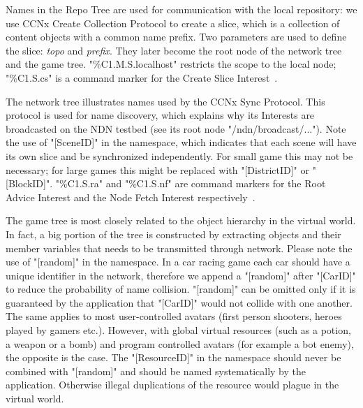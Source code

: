 Names in the Repo Tree are used for communication with the local repository: we use CCNx Create Collection Protocol to create a slice, which is a collection of content objects with a common name prefix. Two parameters are used to define the slice: \emph{topo} and \emph{prefix}. They later become the root node of the network tree and the game tree. "{\%C1.M.S.localhost}" restricts the scope to the local node; "{\%C1.S.cs}" is a command marker for the Create Slice Interest~\cite{CCNxCS}. 

The network tree illustrates names used by the CCNx Sync Protocol. This protocol is used for name discovery, which explains why its Interests are broadcasted on the NDN testbed (see its root node "{/ndn/broadcast/...}"). Note the use of "{[SceneID]}" in the namespace, which indicates that each scene will have its own slice and be synchronized independently. For small game this may not be necessary; for large games this might be replaced with "{[DistrictID]}" or "{[BlockID]}". "{\%C1.S.ra}" and "{\%C1.S.nf}" are command markers for the Root Advice Interest and the Node Fetch Interest respectively~\cite{CCNxSync}.

The game tree is most closely related to the object hierarchy in the virtual world. In fact, a big portion of the tree is constructed by extracting objects and their member variables that needs to be transmitted through network. Please note the use of "{[random]}" in the namespace. In a car racing game each car should have a unique identifier in the network, therefore we append a "{[random]}" after "{[CarID]}" to reduce the probability of name collision. "{[random]}" can be omitted only if it is guaranteed by the application that  "{[CarID]}" would not collide with one another. The same applies to most user-controlled avatars (first person shooters, heroes played by gamers etc.). However, with global virtual resources (such as a potion, a weapon or a bomb) and program controlled avatars (for example a bot enemy), the opposite is the case. The "{[ResourceID]}" in the namespace should never be combined with "{[random]}" and should be named systematically by the application. Otherwise illegal duplications of the resource would plague in the virtual world. 

